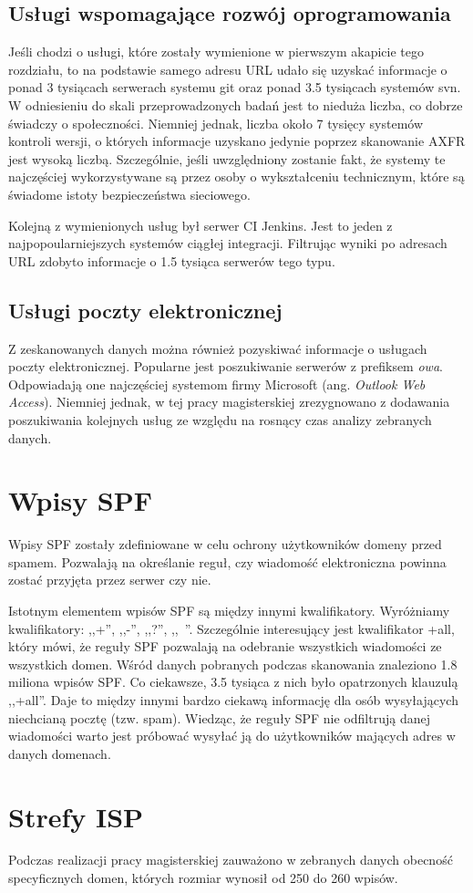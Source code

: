 \subsection{Usługi wspomagające rozwój oprogramowania}
Jeśli chodzi o usługi, które zostały wymienione w pierwszym akapicie tego rozdziału, to na podstawie samego adresu URL udało się
uzyskać informacje o ponad 3 tysiącach serwerach systemu git oraz ponad 3.5 tysiącach systemów svn. W odniesieniu do skali
przeprowadzonych badań jest to nieduża liczba, co dobrze świadczy o społeczności. Niemniej jednak, liczba około 7 tysięcy systemów
kontroli wersji, o których informacje uzyskano jedynie poprzez skanowanie AXFR jest wysoką liczbą. Szczególnie, jeśli uwzględniony
zostanie fakt, że systemy te najczęściej wykorzystywane są przez osoby o wykształceniu technicznym, które są świadome istoty
bezpieczeństwa sieciowego.

Kolejną z wymienionych usług był serwer CI Jenkins. Jest to jeden z najpopoularniejszych systemów ciągłej integracji. Filtrując
wyniki po adresach URL zdobyto informacje o 1.5 tysiąca serwerów tego typu.

\subsection{Usługi poczty elektronicznej}
Z zeskanowanych danych można również pozyskiwać informacje o usługach poczty elektronicznej. Popularne jest poszukiwanie
serwerów z prefiksem \textit{owa}. Odpowiadają one najczęściej systemom firmy Microsoft (ang. \textit{Outlook Web Access}).
Niemniej jednak, w tej pracy magisterskiej zrezygnowano z dodawania poszukiwania kolejnych usług ze względu na rosnący czas
analizy zebranych danych.

\section{Wpisy SPF}
Wpisy SPF zostały zdefiniowane w celu ochrony użytkowników domeny przed spamem. Pozwalają na określanie reguł, czy wiadomość
elektroniczna powinna zostać przyjęta przez serwer czy nie.

Istotnym elementem wpisów SPF są między innymi kwalifikatory. Wyróżniamy kwalifikatory: ,,+'', ,,-'', ,,?'', ,,~''. Szczególnie
interesujący jest kwalifikator +all, który mówi, że reguły SPF pozwalają na odebranie wszystkich wiadomości ze wszystkich domen.
Wśród danych pobranych podczas skanowania znaleziono 1.8 miliona wpisów SPF. Co ciekawsze, 3.5 tysiąca z nich było opatrzonych
klauzulą ,,+all''. Daje to między innymi bardzo ciekawą informację dla osób wysyłających niechcianą pocztę (tzw. spam). Wiedząc,
że reguły SPF nie odfiltrują danej wiadomości warto jest próbować wysyłać ją do użytkowników mających adres w danych domenach.

\section{Strefy ISP}
Podczas realizacji pracy magisterskiej zauważono w zebranych danych obecność specyficznych domen, których rozmiar wynosił od
250 do 260 wpisów.
